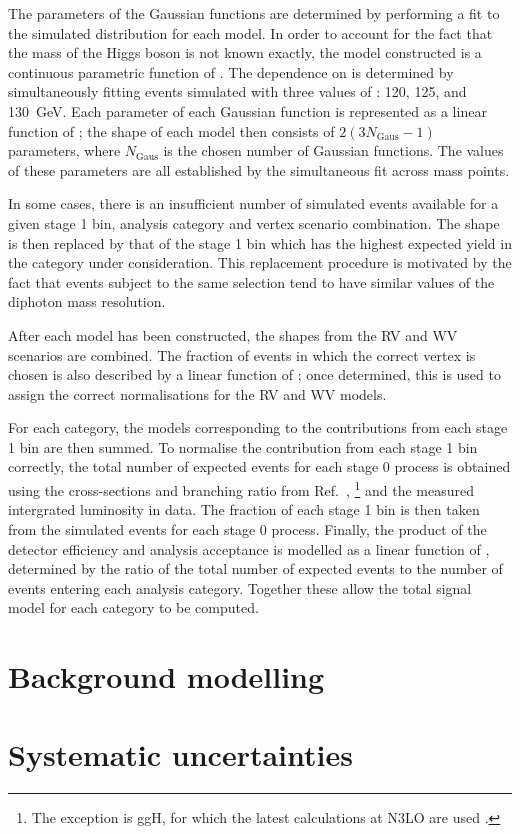 The parameters of the Gaussian functions are determined by performing a fit 
to the simulated \mgg distribution for each model.
In order to account for the fact that the mass of the Higgs boson is not known exactly, 
the model constructed is a continuous parametric function of \mH.
The dependence on \mH is determined by simultaneously fitting events simulated with 
three values of \mH: 120, 125, and \SI{130}{GeV}.
Each parameter of each Gaussian function is represented as a linear function of \mH; 
the shape of each model then consists of $2\left(3N_{\textrm{Gaus}}-1\right)$ parameters, 
where $N_{\textrm{Gaus}}$ is the chosen number of Gaussian functions.
The values of these parameters are all established by the simultaneous fit across mass points.


In some cases, there is an insufficient number of simulated events available for a given stage 1 bin, 
analysis category and vertex scenario combination. %
The shape is then replaced by that of the stage 1 bin 
which has the highest expected yield in the category under consideration.
This replacement procedure is motivated by the fact that events subject to the same selection
tend to have similar values of the diphoton mass resolution.

After each model has been constructed, the shapes from the RV and WV scenarios are combined.
The fraction of events in which the correct vertex is chosen 
is also described by a linear function of \mH; 
once determined, this is used to assign the correct normalisations for the RV and WV models.


For each category, 
the models corresponding to the contributions from each stage 1 bin are then summed.
To normalise the contribution from each stage 1 bin correctly, 
the total number of expected events for each stage 0 process is obtained 
using the cross-sections and \Hgg branching ratio from Ref.~\cite{YR4}, 
\footnote{The exception is ggH, 
for which the latest calculations at N3LO are used \cite{Anastasiou2016,Anastasiou2017}.}
and the measured intergrated luminosity in data.
The fraction of each stage 1 bin is then taken from the simulated events for each stage 0 process.
Finally, the product of the detector efficiency and analysis acceptance 
is modelled as a linear function of \mH, 
determined by the ratio of the total number of expected events 
to the number of events entering each analysis category.
Together these allow the total signal model for each category to be computed.



\section{Background modelling}

\section{Systematic uncertainties}
